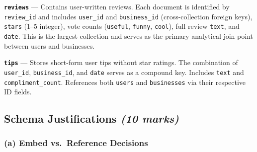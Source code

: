 \documentclass[12pt,a4paper]{article}
\newcommand{\code}[1]{\texttt{#1}}
\newcommand{\marks}[1]{\hfill\textit{(#1 marks)}}
\begin{document}
\textbf{\code{reviews}} --- Contains user-written reviews. Each document is
identified by \code{review\_id} and includes \code{user\_id} and
\code{business\_id} (cross-collection foreign keys), \code{stars}
(1--5 integer), vote counts (\code{useful}, \code{funny}, \code{cool}), full
review \code{text}, and \code{date}. This is the largest collection and serves
as the primary analytical join point between users and businesses.

\textbf{\code{tips}} --- Stores short-form user tips without star ratings.
The combination of \code{user\_id}, \code{business\_id}, and \code{date} serves
as a compound key. Includes \code{text} and \code{compliment\_count}. References
both \code{users} and \code{businesses} via their respective ID fields.

\subsection{Schema Justifications \marks{10}}

\subsubsection{(a) Embed vs.\ Reference Decisions}
\end{document}
